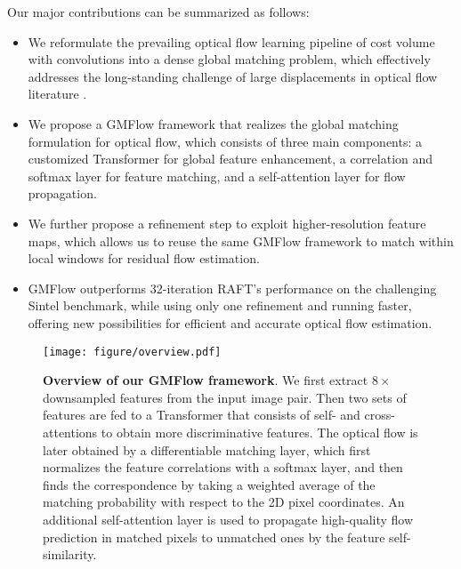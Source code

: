 \documentclass[10pt,twocolumn,letterpaper]{article}
\begin{document}
Our major contributions can be summarized as follows:
\begin{itemize}
	\vspace{-5pt}
	\item We reformulate the prevailing optical flow learning pipeline of cost volume with convolutions into a dense global matching problem, which effectively addresses the long-standing challenge of large displacements in optical flow literature \cite{brox2009large,weinzaepfel2013deepflow,brox2004high,chen2013large,bailer2015flow}.
	\vspace{-5pt}
	\item We propose a GMFlow framework that realizes the global matching formulation for optical flow, which consists of three main components: a customized Transformer for global feature enhancement, a correlation and softmax layer for feature matching, and a self-attention layer for flow propagation.   
	\vspace{-5pt}
	\item We further propose a refinement step to exploit higher-resolution feature maps, which allows us to reuse the same GMFlow framework to match within local windows for residual flow estimation.
	\vspace{-5pt}
	\item GMFlow outperforms 32-iteration RAFT’s performance on the challenging Sintel benchmark, while using only one refinement and running faster, offering new possibilities for efficient and accurate optical flow estimation.
\end{itemize}
\vspace{-5pt}










\begin{figure*}
    \centering
    \texttt{[image: figure/overview.pdf]}
    \caption{\textbf{Overview of our GMFlow framework}. We first extract $8\times$ downsampled features from the input image pair. Then two sets of features are fed to a Transformer that consists of self- and cross-attentions to obtain more discriminative features. The optical flow is later obtained by a differentiable matching layer, which first normalizes the feature correlations with a softmax layer, and then finds the correspondence by taking a weighted average of the matching probability with respect to the 2D pixel coordinates. An additional self-attention layer is used to propagate high-quality flow prediction in matched pixels to unmatched ones by the feature self-similarity.}
    \label{fig:overview}
    \vspace{-6pt}
\end{figure*}
\end{document}
